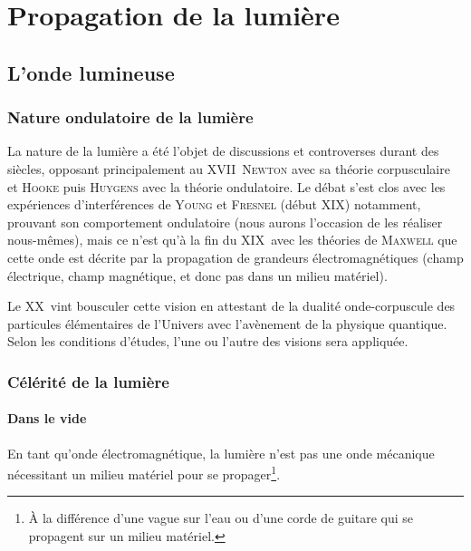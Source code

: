 \documentclass[../main/main.tex]{subfiles}
\begin{document}
\chapter{Propagation de la lumi\`ere}

\section{L'onde lumineuse}

\subsection{Nature ondulatoire de la lumière}

La nature de la lumière a été l'objet de discussions et controverses durant des
siècles, opposant principalement au XVII\ieme\ \textsc{Newton} avec sa théorie
corpusculaire et \textsc{Hooke} puis \textsc{Huygens} avec la théorie
ondulatoire. Le débat s'est clos avec les expériences d'interférences de
\textsc{Young} et \textsc{Fresnel} (début XIX\ieme) notamment, prouvant son
comportement ondulatoire (nous aurons l'occasion de les réaliser nous-mêmes),
mais ce n'est qu'à la fin du XIX\ieme\ avec les théories de \textsc{Maxwell} que
cette onde est décrite par la propagation de grandeurs électromagnétiques (champ
électrique, champ magnétique, et donc pas dans un milieu matériel).

Le XX\ieme\ vint bousculer cette vision en attestant de la dualité
onde-corpuscule des particules élémentaires de l'Univers avec l'avènement de la
physique quantique. Selon les conditions d'études, l'une ou l'autre des visions
sera appliquée.

\subsection{Célérité de la lumière}

\subsubsection{Dans le vide}

En tant qu'onde électromagnétique, la lumière n'est pas une onde mécanique
nécessitant un milieu matériel pour se propager\footnote{À la différence d'une
    vague sur l'eau ou d'une corde de guitare qui se propagent sur un milieu
matériel.}.
\end{document}
